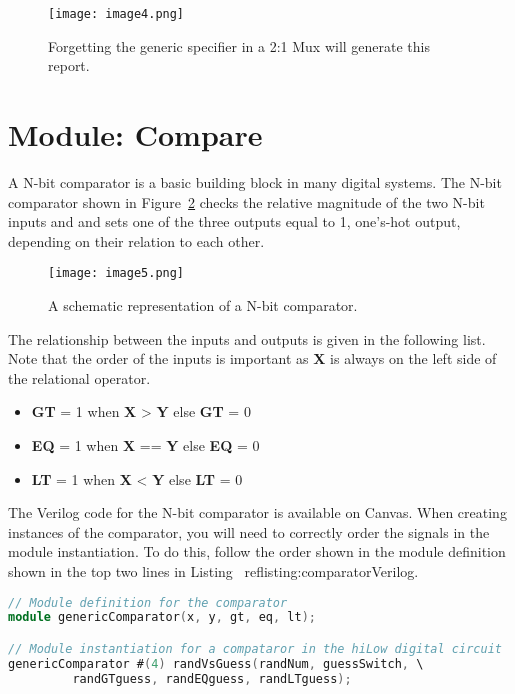 \begin{figure}[ht]
\texttt{[image: image4.png]}
\caption{Forgetting the generic specifier in a 2:1 Mux will generate this report.}
\label{fig:vectorSizeWarnings}
\end{figure}

\hypertarget{compare-module}{%
\section{Module: Compare}\label{compare-module}}

A N-bit comparator is a basic building block in many digital systems.
The N-bit comparator shown in Figure~\ref{fig:comparatorSymbol} 
checks the relative magnitude of
the two N-bit inputs  and  and sets one of the three
outputs equal to 1, one's-hot output, depending on their relation to
each other.

\begin{figure}[ht]
\texttt{[image: image5.png]}
\caption{A schematic representation of a N-bit comparator.}
\label{fig:comparatorSymbol}
\end{figure}

The relationship between the inputs and outputs is given in the
following list. Note that the order of the inputs is important as
\textbf{X} is always on the left side of the relational operator.

\begin{itemize}
\item    \textbf{GT} = 1 when \textbf{X} \textgreater{} \textbf{Y} else  \textbf{GT} = 0
\item    \textbf{EQ} = 1 when \textbf{X} == \textbf{Y} else \textbf{EQ} = 0
\item    \textbf{LT} = 1 when \textbf{X} \textless{} \textbf{Y} else   \textbf{LT} = 0
\end{itemize}

The Verilog code for the N-bit comparator is available on Canvas.
When creating instances of the comparator, you will need to correctly
order the signals in the module instantiation. To do this, follow the
order shown in the module definition shown in the top two lines in
Listing ~ref{listing:comparatorVerilog}.

\begin{lstlisting}[language=Verilog,
 caption={Top, the module definition for the comparator.  Bottom, module
 instantiation of a comparator in Figure~\ref{fig:comparatorSymbol}. Remove the 
component instantiation line break in your code.},
 label={listing:comparatorVerilog},
 frame=single]
// Module definition for the comparator
module genericComparator(x, y, gt, eq, lt);

// Module instantiation for a compataror in the hiLow digital circuit
genericComparator #(4) randVsGuess(randNum, guessSwitch, \
		 randGTguess, randEQguess, randLTguess);
\end{lstlisting}

